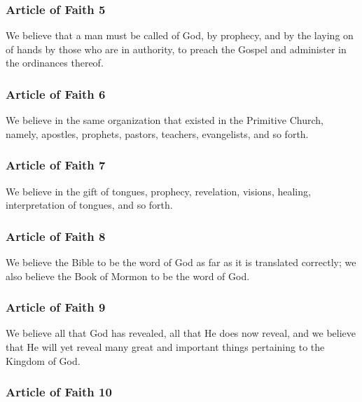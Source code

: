 	\subsubsection{Article of Faith 5}
		\label{ARTICLESOFFAITH-5}
		
		We believe that a man must be called of God, by prophecy, and by the laying on of hands by those who are in authority, to preach the Gospel and administer in the ordinances thereof.
		
	\subsubsection{Article of Faith 6}
		\label{ARTICLESOFFAITH-6}
		
		We believe in the same organization that existed in the Primitive Church, namely, apostles, prophets, pastors, teachers, evangelists, and so forth.
		
	\subsubsection{Article of Faith 7}
		\label{ARTICLESOFFAITH-7}
		
		We believe in the gift of tongues, prophecy, revelation, visions, healing, interpretation of tongues, and so forth.
		
	\subsubsection{Article of Faith 8}
		\label{ARTICLESOFFAITH-8}
		
		We believe the Bible to be the word of God as far as it is translated correctly; we also believe the Book of Mormon to be the word of God.
		
	\subsubsection{Article of Faith 9}
		\label{ARTICLESOFFAITH-9}
		
		We believe all that God has revealed, all that He does now reveal, and we believe that He will yet reveal many great and important things pertaining to the Kingdom of God.
		
	\subsubsection{Article of Faith 10}
		\label{ARTICLESOFFAITH-10}
		
